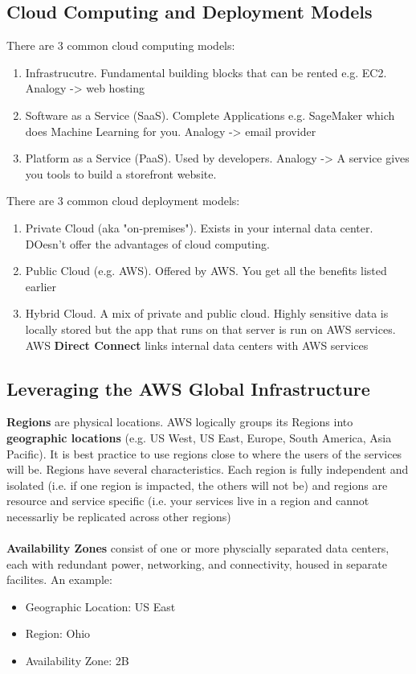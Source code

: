 \documentclass{article}%
\begin{document}
\subsection{Cloud Computing and Deployment Models}
There are 3 common cloud computing models:
\begin{enumerate}
    \item Infrastrucutre. Fundamental building blocks that can be rented e.g. EC2. Analogy -> web hosting
    \item Software as a Service (SaaS). Complete Applications e.g. SageMaker which does Machine Learning for you. Analogy -> email provider
    \item Platform as a Service (PaaS). Used by developers. Analogy -> A service gives you tools to build a storefront website. 
\end{enumerate}
There are 3 common cloud deployment models:
\begin{enumerate}
    \item Private Cloud (aka "on-premises"). Exists in your internal data center. DOesn't offer the advantages of cloud computing.
    \item Public Cloud (e.g. AWS). Offered by AWS. You get all the benefits listed earlier
    \item Hybrid Cloud. A mix of private and public cloud. Highly sensitive data is locally stored but the app that runs on that server is run on AWS services. AWS \textbf{Direct Connect} links internal data centers with AWS services
\end{enumerate}
\subsection{Leveraging the AWS Global Infrastructure}
\textbf{Regions} are physical locations. AWS logically groups its Regions into \textbf{geographic locations} (e.g. US West, US East, Europe, South America, Asia Pacific).
It is best practice to use regions close to where the users of the services will be. Regions have several characteristics. Each region is fully independent and isolated (i.e. if one region is impacted, the others will not be) and regions are resource and service specific (i.e. your services live in a region and cannot necessarliy be replicated across other regions) \\ \\

\textbf{Availability Zones} consist of one or more physcially separated data centers, each with redundant power, networking, and connectivity, housed in separate facilites. An example:
\begin{itemize}
    \item Geographic Location: US East
    \item Region: Ohio
    \item Availability Zone: 2B
\end{itemize}
\end{document}
